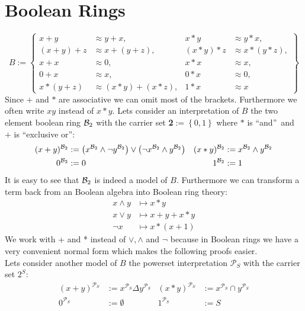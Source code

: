 \section{Boolean Rings}
\[B:=\left\lbrace 
	\begin{aligned}
		x+y     & \approx y+x,         & x*y     & \approx y*x,     \\
		(x+y)+z & \approx x+(y+z),     & (x*y)*z & \approx x*(y*z), \\
		x+x     & \approx 0,           & x*x     & \approx x,       \\
		0+x     & \approx x,           & 0*x     & \approx 0,       \\
		x*(y+z) & \approx (x*y)+(x*z), & 1*x     & \approx x        
	\end{aligned}
	\right\rbrace \]
	Since $+$ and $*$ are associative we can omit most of the brackets. Furthermore we often write $xy$ instead of $x*y$.
	Lets consider an interpretation of $B$ the two element boolean ring ${\mathcal{B}_2}$ with the carrier set \textbf{2}$:=\left\lbrace 0,1\right\rbrace$ where $*$ is \textquotedblleft and\textquotedblright\ and $+$ is \textquotedblleft exclusive or\textquotedblright:
	\begin{align*}
		(x+y)^{\mathcal{B}_2} & :=\left( x^{\mathcal{B}_2}\wedge\neg y^{\mathcal{B}_2}\right)  \vee \left( \neg x^{\mathcal{B}_2}\wedge y^{\mathcal{B}_2}\right) & (x*y)^{\mathcal{B}_2} & :=x^{\mathcal{B}_2}\wedge y^{\mathcal{B}_2} \\
		0^{\mathcal{B}_2}     & :=0            & 1^{\mathcal{B}_2}     & :=1                     
	\end{align*}
	It is easy to see that ${\mathcal{B}_2}$ is indeed a model of $B$. Furthermore we can transform a term back from an Boolean algebra into Boolean ring theory:
	\begin{align*}
		x \wedge y & \mapsto x*y     \\
		x\vee y    & \mapsto x+y+x*y \\
		\neg x     & \mapsto x*(x+1) 
	\end{align*}
	We work with + and * instead of $\vee,\wedge$ and $\neg$ because in Boolean rings we have a very convenient normal form which makes the following proofs easier.\\
	Lets consider another model of $B$ the powerset interpretation $\mathcal{P}_S$ with the carrier set $2^S$:
	\begin{align*}
		(x+y)^{\mathcal{P}_S} & :=x^{\mathcal{P}_S}\Delta y^{\mathcal{P}_S} & (x*y)^{\mathcal{P}_S} & :=x^{\mathcal{P}_S}\cap y^{\mathcal{P}_S} \\
		0^{\mathcal{P}_S}     & :=\emptyset                                 & 1^{\mathcal{P}_S}     & :=S                                       
	\end{align*}
